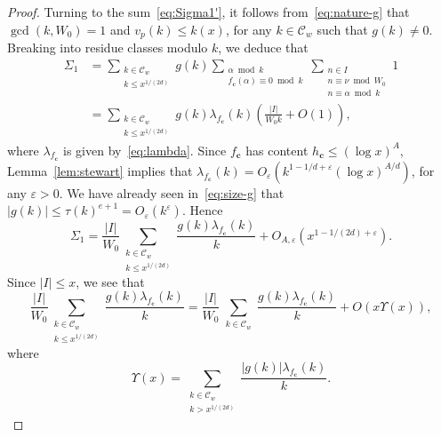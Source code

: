 \documentclass[11pt,letterpaper]{amsart}
\renewcommand{\leq}{\leqslant}
\theoremstyle{definition}
\numberwithin{equation}{section}
\renewcommand{\c}{\mathbf{c}}
\newcommand{\ve}{\varepsilon}
\newcommand{\0}{\mathbf{0}}
\begin{document}
\begin{proof}
Turning to the sum~\eqref{eq:Sigma1'}, 
it follows from~\eqref{eq:nature-g} that 
 $\gcd(k,W_0)=1$ 
and $v_p(k)\leq k(x)$, 
for any $k\in \mathcal{C}_w$ such that $g(k)\neq 0$. 
 Breaking into residue classes modulo $k$, we deduce that 
\begin{align*}
\Sigma_1
&=
\sum_{\substack{k\in \mathcal{C}_w\\ k\leq x^{1/(2d)}}} g(k) 	
\sum_{\substack{\alpha \bmod{k}\\ f_\c(\alpha)\equiv 0 \bmod{k}}}
\sum_{\substack{n\in I
\\ n\equiv \nu\bmod{W_0}\\
n\equiv \alpha\bmod{k}}}1\\
&=
\sum_{\substack{k\in \mathcal{C}_w\\ k\leq x^{1/(2d)}}} g(k) 	
\lambda_{f_\c}(k)
\left(\frac{|I|}{W_0k} +O(1)\right),
\end{align*}
where $\lambda_{f_\c}$ is given by~\eqref{eq:lambda}.
Since $f_\c$ has content  $h_\c\leq (\log x)^A$, 
 Lemma~\ref{lem:stewart} implies that $\lambda_{f_\c}(k)=O_\ve(k^{1-1/d+\ve}(\log x)^{A/d})$, for any $\ve>0$.
We have already seen in~\eqref{eq:size-g} that  $|g(k)|\leq \tau(k)^{e+1}=O_\ve(k^{\ve})$.
Hence
\begin{equation}\label{eq:Sigma1''}
\Sigma_1
=
\frac{|I|}{W_0}
\sum_{\substack{k\in \mathcal{C}_w\\ k\leq x^{1/(2d)}}} \frac{g(k) 	
\lambda_{f_\c}(k)}{k}
+O_{A,\ve}\left(x^{1-1/(2d)+\ve}\right).
\end{equation}
Since $|I|\leq x$, we see that 
$$
\frac{|I|}{W_0}
\sum_{\substack{k\in \mathcal{C}_w\\ k\leq x^{1/(2d)}}} \frac{g(k) 	
\lambda_{f_\c}(k)}{k}=
\frac{|I|}{W_0}
\sum_{\substack{k\in \mathcal{C}_w}} \frac{g(k) 	
\lambda_{f_\c}(k)}{k}+O\left( x\Upsilon(x)\right),
$$
where
\begin{equation}\label{eq:robin}
\Upsilon(x)=\sum_{\substack{k\in \mathcal{C}_w\\  k> x^{1/(2d)}}}  
 \frac{|g(k)| 
\lambda_{f_\c}(k)}{k}.
\end{equation}


\end{proof}
\end{document}
